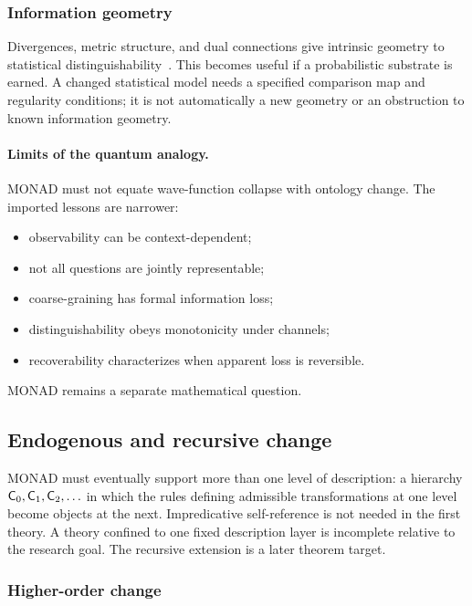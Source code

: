 \subsubsection{Information geometry}

Divergences, metric structure, and dual connections give intrinsic
geometry to statistical distinguishability~\cite{amari2000methods}. This becomes useful if a
probabilistic substrate is earned. A changed statistical model needs a
specified comparison map and regularity conditions; it is not automatically
a new geometry or an obstruction to known information geometry.

\paragraph{Limits of the quantum analogy.}

MONAD must not equate wave-function collapse with ontology change.
The imported lessons are narrower:
\begin{itemize}
  \item observability can be context-dependent;
  \item not all questions are jointly representable;
  \item coarse-graining has formal information loss;
  \item distinguishability obeys monotonicity under channels;
  \item recoverability characterizes when apparent loss is
    reversible.
\end{itemize}
MONAD remains a separate mathematical question.

\subsection{Endogenous and recursive change}

MONAD must eventually support more than one level of description: a
hierarchy $\mathsf{C}_0, \mathsf{C}_1, \mathsf{C}_2, \ldots$ in which the rules defining
admissible transformations at one level become objects at the next.
Impredicative self-reference is not needed in the first theory. A
theory confined to one fixed description layer is incomplete relative
to the research goal. The recursive extension is a later theorem
target.

\subsubsection{Higher-order change}


